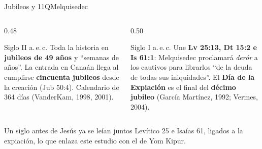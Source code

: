 \documentclass[hyperref={bookmarks=false},aspectratio=169]{beamer}
\newcommand{\destacar}[1]{\textbf{\textcolor{tierraroja}{#1}}}
\begin{document}
\begin{frame}{Jubileos y 11QMelquisedec}
\begin{columns}[t,onlytextwidth]
\begin{column}{0.48\textwidth}
\begin{tcolorbox}[colback=papiro,colframe=tierraroja,boxrule=0.8pt,arc=3pt,title={Libro de los Jubileos},fonttitle=\scriptsize\bfseries,coltitle=papiro,colbacktitle=tierraroja,left=3pt,right=3pt]
\scriptsize\RaggedRight Siglo II a.\,e.\,c. Toda la historia en \destacar{jubileos de 49 años} y ``semanas de años''. La entrada en Canaán llega al cumplirse \destacar{cincuenta jubileos} desde la creación (Jub 50:4). Calendario de 364 días (VanderKam, 1998, 2001).
\end{tcolorbox}
\end{column}
\begin{column}{0.50\textwidth}
\begin{tcolorbox}[colback=papiro,colframe=tierraroja,boxrule=0.8pt,arc=3pt,title={11QMelquisedec (11Q13)},fonttitle=\scriptsize\bfseries,coltitle=papiro,colbacktitle=tierraroja,left=3pt,right=3pt]
\scriptsize\RaggedRight Siglo I a.\,e.\,c. Une \destacar{Lv 25:13, Dt 15:2 e Is 61:1}: Melquisedec proclamará \emph{derór} a los cautivos para librarlos ``de la deuda de todas sus iniquidades''. El \destacar{Día de la Expiación} es el final del \destacar{décimo jubileo} (García Martínez, 1992; Vermes, 2004).
\end{tcolorbox}
\end{column}
\end{columns}
\medskip
\small\RaggedRight Un siglo antes de Jesús ya se leían juntos Levítico 25 e Isaías 61, ligados a la expiación, lo que enlaza este estudio con el de Yom Kipur.
\end{frame}
\end{document}

